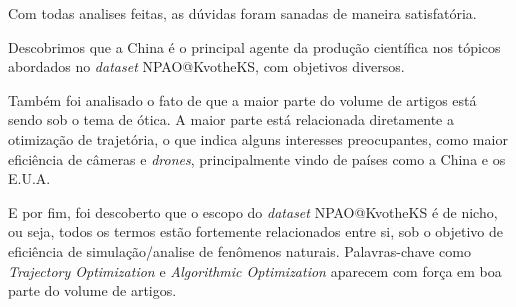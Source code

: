     Com todas analises feitas, as dúvidas foram sanadas de maneira satisfatória. 
    
    Descobrimos que a China é o principal agente da produção científica nos tópicos abordados no \emph{dataset} NPAO@KvotheKS, com objetivos diversos.
    
    Também foi analisado o fato de que a maior parte do volume de artigos está sendo sob o tema de ótica. A maior parte está relacionada diretamente a otimização de trajetória, o que indica alguns interesses preocupantes, como maior eficiência de câmeras e \emph{drones}, principalmente vindo de países como a China e os E.U.A.
    
    E por fim, foi descoberto que o escopo do \emph{dataset} NPAO@KvotheKS é de nicho, ou seja, todos os termos estão fortemente relacionados entre si, sob o objetivo de eficiência de simulação/analise de fenômenos naturais. Palavras-chave como \emph{Trajectory Optimization} e \emph{Algorithmic Optimization} aparecem com força em boa parte do volume de artigos.
    
